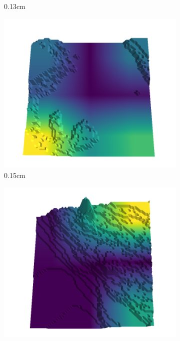 \documentclass[../document.tex]{subfiles}
\begin{document}
\begin{figure}[H]
\begin{subfigure}[b]{0.192\linewidth}
    \caption{0.13cm}
    \label{fig : quarry-worst-17}
    \end{subfigure}
    \begin{subfigure}[b]{0.192\linewidth}
    \includegraphics[width=\linewidth]{../img/5/quarry/worst/15-patch-3d-majavi-colormap-180.png}
    \caption{0.15cm}
    \label{fig : quarry-worst-18}
    \end{subfigure}
    \begin{subfigure}[b]{0.192\linewidth}
    \includegraphics[width=\linewidth]{../img/5/quarry/worst/17-patch-3d-majavi-colormap-190.png}

\end{subfigure}
\end{figure}
\end{document}
